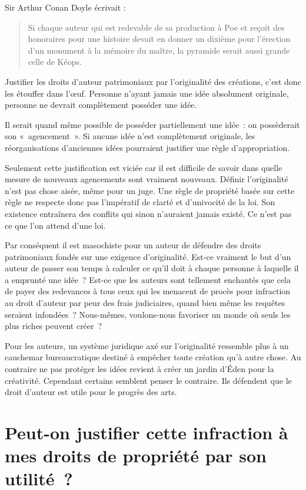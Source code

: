 Sir Arthur Conan Doyle écrivait :
\begin{quotation}
Si chaque auteur qui est redevable de sa production à Poe et reçoit des honoraires pour une histoire devait en donner un dixième pour l’érection d’un monument à la mémoire du maître, la pyramide serait aussi grande celle de Kéops.
\end{quotation}

Justifier les droits d'auteur patrimoniaux par l'originalité des créations, c'est donc les étouffer dans l'œuf. Personne n'ayant jamais une idée absolument originale, personne ne devrait complètement posséder une idée. 

Il serait quand même possible de posséder partiellement une idée~: on possèderait son «~agencement~». Si aucune idée n'est complètement originale, les réorganisations d'anciennes idées pourraient justifier une règle d'appropriation. 

Seulement cette justification est viciée car il est difficile de savoir dans quelle mesure de nouveaux agencements sont vraiment nouveaux. Définir l'originalité n'est pas chose aisée, même pour un juge. Une règle de propriété basée sur cette règle ne respecte donc pas l'impératif de clarté et d'univocité de la loi. Son existence entraînera des conflits qui sinon n'auraient jamais existé. Ce n'est pas ce que l'on attend d'une loi. 

Par conséquent il est masochiste pour un auteur de défendre des droits patrimoniaux fondés sur une exigence d'originalité. Est-ce vraiment le but d'un auteur de passer son temps à calculer ce qu'il doit à chaque personne à laquelle il a emprunté une idée~? Est-ce que les auteurs sont tellement enchantés que cela de payer des redevances à tous ceux qui les menacent de procès pour infraction au droit d'auteur par peur des frais judiciaires, quand bien même les requêtes seraient infondées~? Nous-mêmes, voulons-nous favoriser un monde où seuls les plus riches peuvent créer~?

Pour les auteurs, un système juridique axé sur l'originalité ressemble plus à un cauchemar bureaucratique destiné à empêcher toute création qu'à autre chose. Au contraire ne pas protéger les idées revient à créer un jardin d'Éden pour la créativité. Cependant certains semblent penser le contraire. Ils défendent que le droit d'auteur est utile pour le progrès des arts.

\section{Peut-on justifier cette infraction à mes droits de propriété par son utilité~?}

